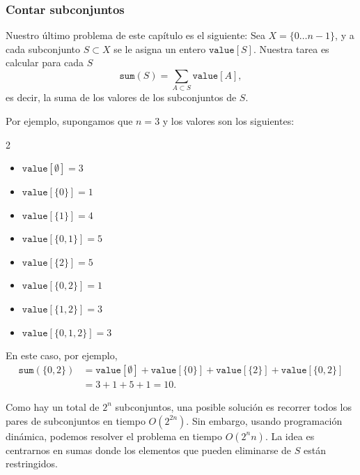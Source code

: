 \subsubsection{Contar subconjuntos}

Nuestro último problema de este capítulo es el siguiente:
Sea $X=\{0 \ldots n-1\}$, y a cada subconjunto $S \subset X$
se le asigna un entero $\texttt{value}[S]$.
Nuestra tarea es calcular para cada $S$
\[\texttt{sum}(S) = \sum_{A \subset S} \texttt{value}[A],\]
es decir, la suma de los valores de los subconjuntos de $S$.

Por ejemplo, supongamos que $n=3$ y los valores son los siguientes:
\begin{multicols}{2}
\begin{itemize}
\item $\texttt{value}[\emptyset] = 3$
\item $\texttt{value}[\{0\}] = 1$
\item $\texttt{value}[\{1\}] = 4$
\item $\texttt{value}[\{0,1\}] = 5$
\item $\texttt{value}[\{2\}] = 5$
\item $\texttt{value}[\{0,2\}] = 1$
\item $\texttt{value}[\{1,2\}] = 3$
\item $\texttt{value}[\{0,1,2\}] = 3$
\end{itemize}
\end{multicols}
En este caso, por ejemplo,
\begin{equation*}
\begin{split}
\texttt{sum}(\{0,2\}) &= \texttt{value}[\emptyset]+\texttt{value}[\{0\}]+\texttt{value}[\{2\}]+\texttt{value}[\{0,2\}] \\
                      &= 3 + 1 + 5 + 1 = 10.
\end{split}
\end{equation*}

Como hay un total de $2^n$ subconjuntos,
una posible solución es recorrer todos los
pares de subconjuntos en tiempo $O(2^{2n})$.
Sin embargo, usando programación dinámica, podemos
resolver el problema en tiempo $O(2^n n)$.
La idea es centrarnos en sumas donde los
elementos que pueden eliminarse de $S$ están restringidos.

